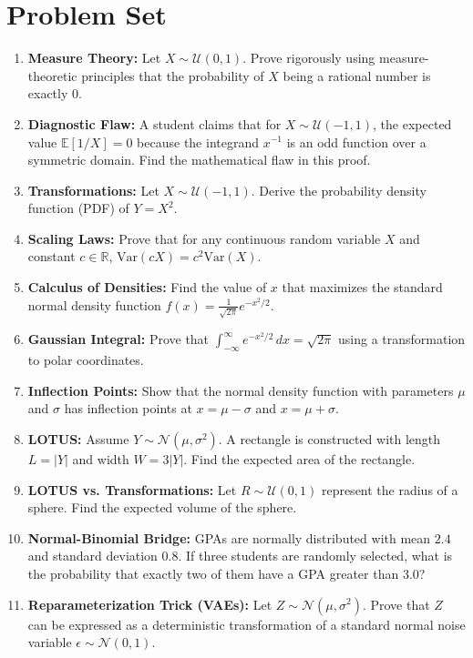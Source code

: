 \documentclass[11pt, a4paper]{article}
\theoremstyle{definition}
\theoremstyle{remark}
\newcommand{\R}{\mathbb{R}}
\newcommand{\E}{\mathbb{E}}
\begin{document}
\newpage

\section{Problem Set}

\begin{enumerate}[label=\textbf{\arabic*.}, leftmargin=*]
    \item \textbf{Measure Theory:} Let $X \sim \mathcal{U}(0, 1)$. Prove rigorously using measure-theoretic principles that the probability of $X$ being a rational number is exactly $0$.
    \item \textbf{Diagnostic Flaw:} A student claims that for $X \sim \mathcal{U}(-1, 1)$, the expected value $\E[1/X] = 0$ because the integrand $x^{-1}$ is an odd function over a symmetric domain. Find the mathematical flaw in this proof.
    \item \textbf{Transformations:} Let $X \sim \mathcal{U}(-1, 1)$. Derive the probability density function (PDF) of $Y = X^2$.
    \item \textbf{Scaling Laws:} Prove that for any continuous random variable $X$ and constant $c \in \R$, $\text{Var}(cX) = c^2\text{Var}(X)$.
    \item \textbf{Calculus of Densities:} Find the value of $x$ that maximizes the standard normal density function $f(x) = \frac{1}{\sqrt{2\pi}}e^{-x^2/2}$.
    \item \textbf{Gaussian Integral:} Prove that $\int_{-\infty}^{\infty} e^{-x^2/2} \, dx = \sqrt{2\pi}$ using a transformation to polar coordinates.
    \item \textbf{Inflection Points:} Show that the normal density function with parameters $\mu$ and $\sigma$ has inflection points at $x = \mu - \sigma$ and $x = \mu + \sigma$.
    \item \textbf{LOTUS:} Assume $Y \sim \mathcal{N}(\mu, \sigma^2)$. A rectangle is constructed with length $L = |Y|$ and width $W = 3|Y|$. Find the expected area of the rectangle.
    \item \textbf{LOTUS vs. Transformations:} Let $R \sim \mathcal{U}(0, 1)$ represent the radius of a sphere. Find the expected volume of the sphere.
    \item \textbf{Normal-Binomial Bridge:} GPAs are normally distributed with mean $2.4$ and standard deviation $0.8$. If three students are randomly selected, what is the probability that exactly two of them have a GPA greater than $3.0$?
    \item \textbf{Reparameterization Trick (VAEs):} Let $Z \sim \mathcal{N}(\mu, \sigma^2)$. Prove that $Z$ can be expressed as a deterministic transformation of a standard normal noise variable $\epsilon \sim \mathcal{N}(0, 1)$.

\end{enumerate}
\end{document}
